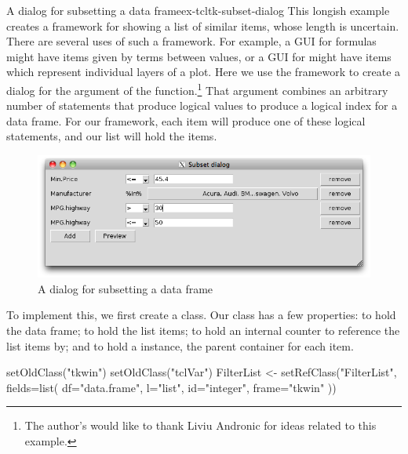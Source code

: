 \begin{example}{A dialog for subsetting a data frame}{ex-tcltk-subset-dialog}
%
%
This longish example creates a framework for showing a list of similar
items, whose length is uncertain. There are several uses of such a framework. For example, a GUI
for formulas might have items given by terms between \code{+} values,
or a GUI for  might have items which represent individual
layers of a plot. Here we use the framework to create a dialog for the
 argument of the 
function.\footnote{The author's would like to thank Liviu Andronic for
  ideas related to this example.} That argument
combines an arbitrary number of statements that produce logical values
to produce a logical index for a data frame. For our framework, each
item will produce one of these logical statements, and our list will
hold the items.
%
\begin{figure}
  \centering
  \includegraphics[width=.8\textwidth]{fig-tcltk-subset-filter.png}
  \caption{A dialog for subsetting a data frame}
  \label{fig:tcltk-subset-filter}
\end{figure}
%

To implement this, we first create a  class. Our
class has a few properties:  to hold the data frame; 
to hold the list items;  to hold an internal counter to
reference the list items by; and  to hold a
 instance, the parent container for each item.

\begin{Schunk}
\begin{Sinput}
 setOldClass("tkwin")
 setOldClass("tclVar")
 FilterList <- setRefClass("FilterList",
                           fields=list(
                             df="data.frame",
                             l="list",
                             id="integer",
                             frame="tkwin" 
                             ))
\end{Sinput}
\end{Schunk}


\end{example}
